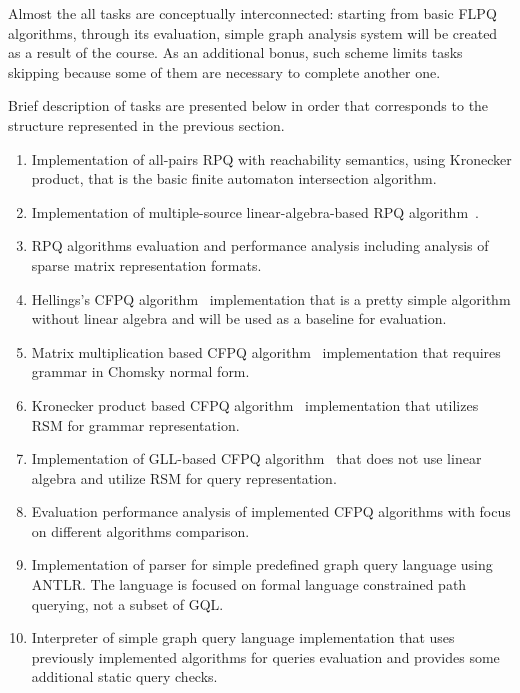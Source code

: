 \documentclass[sigconf]{acmart}
\begin{document}
Almost the all tasks are conceptually interconnected: starting from basic FLPQ algorithms, through its evaluation, simple graph analysis system will be created as a result of the course.
As an additional bonus, such scheme limits tasks skipping because some of them are necessary to complete another one.

Brief description of tasks are presented below in order that corresponds to the structure represented in the previous section.
\begin{enumerate}
  \item Implementation of all-pairs RPQ with reachability semantics, using Kronecker product, that is the basic finite automaton intersection algorithm.
  \item Implementation of multiple-source linear-algebra-based RPQ algorithm~\cite{belyanin2024singlesourceregularpathquerying}.%
  \item RPQ algorithms evaluation and performance analysis including analysis of sparse matrix representation formats.
  \item Hellings's CFPQ algorithm~\cite{conf/icdt/Hellings14} implementation that is a pretty simple algorithm without linear algebra and will be used as a baseline for evaluation. 
  \item Matrix multiplication based CFPQ algorithm~\cite{10.1145/3210259.3210264} implementation that requires grammar in Chomsky normal form.
  \item Kronecker product based CFPQ algorithm~\cite{10.1007/978-3-030-54832-2_6} implementation that utilizes RSM for grammar representation.
  \item Implementation of GLL-based CFPQ algorithm~\cite{abzalov2023gllbasedcontextfreepathquerying} that does not use linear algebra and utilize RSM for query representation. 
  \item Evaluation performance analysis of implemented CFPQ algorithms with focus on different algorithms comparison. 
  \item Implementation of parser for simple predefined graph query language using ANTLR. The language is focused on formal language constrained path querying, not a subset of GQL.
  \item Interpreter of simple graph query language implementation that uses previously implemented algorithms for queries evaluation and provides some additional static query checks.
\end{enumerate}
\end{document}
